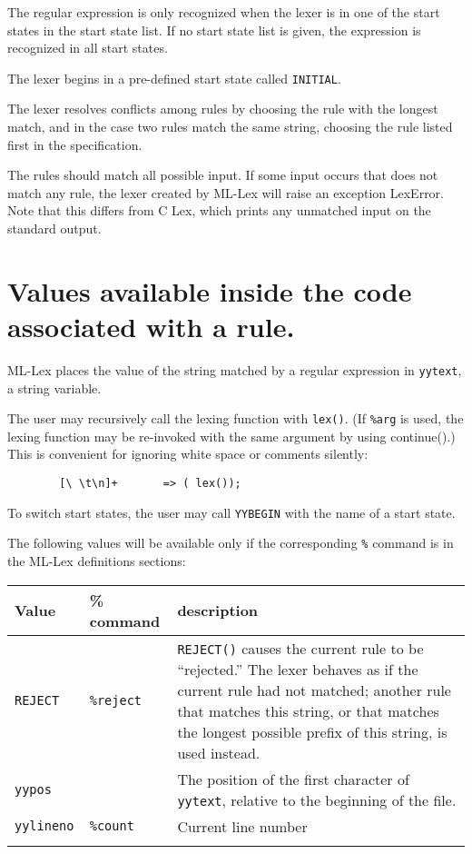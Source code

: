The regular expression is only recognized when the lexer is in one of
the start states in the start state list.  If no start state list is
given, the expression is recognized in all start states.

The lexer begins in a pre-defined start state called \verb|INITIAL|.

The lexer resolves conflicts among rules by choosing the rule with
the longest match, and in the case two rules match the same string,
choosing the rule listed first in the specification.

The rules should match all possible input.  If some input occurs that
does not match any rule, the lexer created by ML-Lex will raise an
exception LexError.  Note that this differs from C Lex, which prints
any unmatched input on the standard output.

\section{Values available inside the code associated with a rule.}
\label{avail}

ML-Lex places the value of the string matched by a regular expression
in \verb|yytext|, a string variable.  

The user may recursively
call the lexing function with \verb|lex()|.  (If \verb|%arg| is used, the
lexing function may be re-invoked with the same argument by using
continue().) This is convenient for ignoring white space or comments silently:

\begin{verbatim}
        [\ \t\n]+       => ( lex());
\end{verbatim}

To switch start states, the user may call \verb|YYBEGIN| with the name of a
start state.

The following values will be available only if the corresponding \verb|%|
command is in the ML-Lex definitions sections:

\begin{tabular}{lll}
\\
{\bf Value}&{\bf \% command}&{\bf description}\\
\hline
{\tt REJECT} &{\tt\%reject}&\parbox[t]{2.6in}{{\tt REJECT()} causes the current
                                        rule to be ``rejected.''
                                        The lexer behaves as if the
                                        current rule had not matched;
                                        another rule that matches this
                                        string, or that matches the longest
                                        possible prefix of this string,
                                        is used instead.} \\
{\tt yypos} & & \parbox[t]{2.6in}{The position of the first character
of {\tt yytext}, relative to the beginning of the file.}\\
{\tt yylineno } & {\tt \%count} &         Current line number\\
\\
\end{tabular}
        

